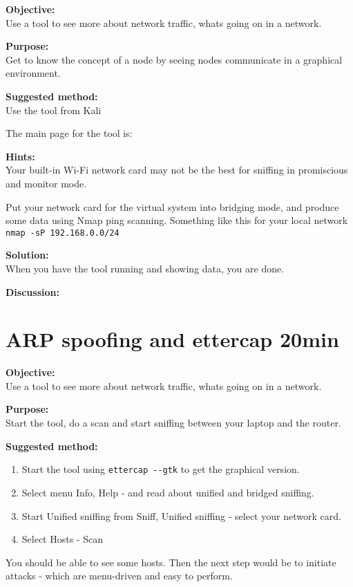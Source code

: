 \documentclass[a4paper,11pt,notitlepage]{report}
\begin{document}
{\bf Objective:}\\
Use a tool to see more about network traffic, whats going on in a network.

{\bf Purpose:}\\
Get to know the concept of a node by seeing nodes communicate in a graphical environment.

{\bf Suggested method:}\\
Use the tool from Kali

The main page for the tool is:

{\bf Hints:}\\
Your built-in Wi-Fi network card may not be the best for sniffing in promiscious and monitor mode.

Put your network card for the virtual system into bridging mode, and produce some data using Nmap ping scanning. Something like this for your local network \verb+nmap -sP 192.168.0.0/24+

{\bf Solution:}\\
When you have the tool running and showing data, you are done.

{\bf Discussion:}\\


\chapter{ARP spoofing and ettercap 20min}
\label{ex:arp-spoof-ettercap}



{\bf Objective:}\\
Use a tool to see more about network traffic, whats going on in a network.

{\bf Purpose:}\\
Start the tool, do a scan and start sniffing between your laptop and the router.

{\bf Suggested method:}
\begin{enumerate}
\item Start the tool using \verb+ettercap --gtk+ to get the graphical version.
\item Select menu Info, Help - and read about unified and bridged sniffing.
\item Start Unified sniffing from Sniff, Unified sniffing - select your network card.
\item Select Hosts - Scan
\end{enumerate}

You should be able to see some hosts. Then the next step would be to initiate attacks - which are menu-driven and easy to perform.
\end{document}
